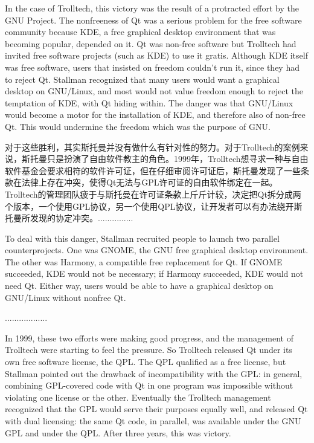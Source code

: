 \ifdefined\eng
In the case of Trolltech, this victory was the result of a protracted effort by the GNU Project. The nonfreeness of Qt was a serious problem for the free software community because KDE, a free graphical desktop environment that was becoming popular, depended on it. Qt was non-free software but Trolltech had invited free software projects (such as KDE) to use it gratis. Although KDE itself was free software, users that insisted on freedom couldn't run it, since they had to reject Qt. Stallman recognized that many users would want a graphical desktop on GNU/Linux, and most would not value freedom enough to reject the temptation of KDE, with Qt hiding within. The danger was that GNU/Linux would become a motor for the installation of KDE, and therefore also of non-free Qt. This would undermine the freedom which was the purpose of GNU.
\fi

\ifdefined\chs
对于这些胜利，其实斯托曼并没有做什么有针对性的努力。对于Trolltech的案例来说，斯托曼只是扮演了自由软件教主的角色。1999年，Trolltech想寻求一种与自由软件基金会要求相符的软件许可证，但在仔细审阅许可证后，斯托曼发现了一些条款在法律上存在冲突，使得Qt无法与GPL许可证的自由软件绑定在一起。Trolltech的管理团队疲于与斯托曼在许可证条款上斤斤计较，决定把Qt拆分成两个版本，一个使用GPL协议，另一个使用QPL协议，让开发者可以有办法绕开斯托曼所发现的协定冲突。...............
\fi

\ifdefined\eng
To deal with this danger, Stallman recruited people to launch two parallel counterprojects. One was GNOME, the GNU free graphical desktop environment. The other was Harmony, a compatible free replacement for Qt. If GNOME succeeded, KDE would not be necessary; if Harmony succeeded, KDE would not need Qt. Either way, users would be able to have a graphical desktop on GNU/Linux without nonfree Qt.
\fi

\ifdefined\chs
..................
\fi

In 1999, these two efforts were making good progress, and the management of Trolltech were starting to feel the pressure. So Trolltech released Qt under its own free software license, the QPL. The QPL qualified as a free license, but Stallman pointed out the drawback of incompatibility with the GPL: in general, combining GPL-covered code with Qt in one program was impossible without violating one license or the other. Eventually the Trolltech management recognized that the GPL would serve their purposes equally well, and released Qt with dual licensing: the same Qt code, in parallel, was available under the GNU GPL and under the QPL. After three years, this was victory.

